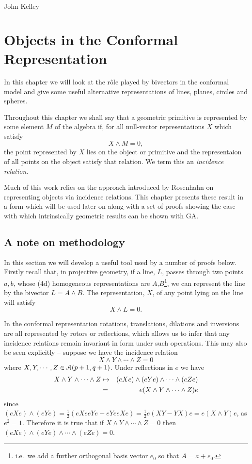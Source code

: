 \begin{savequote}
%
{John Kelley}%
\end{savequote}
\chapter{Objects in the Conformal Representation}

In this chapter we will look
at the r\^ole played by bivectors in the conformal model and give some useful
alternative representations of lines, planes, circles and spheres.

Throughout this chapter we shall say that a geometric primitive is
represented by some element $M$ of the algebra if, for all
null-vector representations $X$ which satisfy
\[
X \wedge M = 0,
\]
the point represented by $X$ lies on the object or primitive and the representaion of all
points on the object satisfy that relation. We term this an \emph{incidence
relation}.

Much of this work relies on the approach introduced by Rosenhahn\cite{bodo-thesis} on representing
objects via incidence relations. This chapter presents these result in a form which will be used
later on along with a set of proofs showing the ease with which intrinsically geometric results can
be shown with GA.

\section{A note on methodology}
 
In this section we will develop a useful tool used by a number of proofs below.
Firstly recall that, in projective geometry, if a line, $L$, 
passes through two points $a,b$, whose (4d) homogeneous representations are 
$A$,$B$\footnote{i.e.\ we add a further orthogonal basis vector $e_0$ so that
$A = a + e_0$.}, we can represent the line by the bivector $L=A\wedge B$. The 
representation, $X$, of any point lying on the line will satisfy
%
\[ X\wedge L = 0.  \]

In the conformal representation rotations, translations, dilations and inversions
are all represented by rotors or reflections, which allows us to infer that any
incidence relations remain invariant in form under such operations. This may
also be seen explicitly -- suppose we have the incidence relation
%
\[ X \wedge Y \wedge \cdots  \wedge Z = 0 \]
%
where $X,Y,\cdots,Z \in {\mathcal{A}}(p+1,q+1)$. Under
reflections in $e$ we have
%
\begin{eqnarray}
   X \wedge Y \wedge \cdots  \wedge Z & \mapsto & (eXe) \wedge (eYe) \wedge \cdots
\wedge (eZe) \nonumber \\
   & = & e( X \wedge Y \wedge \cdots  \wedge Z)e \nonumber
\end{eqnarray}
%
since $(eXe)\wedge (eYe) = \frac{1}{2}(eXeeYe - eYeeXe) = \frac{1}{2}e(XY-YX)e 
= e(X\wedge Y)e$, as $e^2=1$. Therefore it is true that if $X\wedge Y\wedge \cdots
\wedge Z=0$ then $(eXe)\wedge (eYe)\wedge \cdots \wedge (eZe)=0$.

